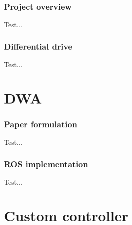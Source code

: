 \documentclass{beamer}
\begin{document}

\begin{frame}
\frametitle{Project overview}

Test...

\end{frame}


\begin{frame}
\frametitle{Differential drive}

Test...

\end{frame}



\section{DWA}


\begin{frame}
\frametitle{Paper formulation}

Test...

\end{frame}


\begin{frame}
\frametitle{ROS implementation}

Test...

\end{frame}




\section{Custom controller}

\end{document}
